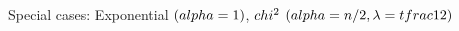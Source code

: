 \documentclass[preview]{standalone}
\begin{document}
Special cases: Exponential $(\\alpha=1)$, $\\chi^2$ $(\\alpha=n/2,\\ \lambda=\\tfrac12)$\\
\end{document}
